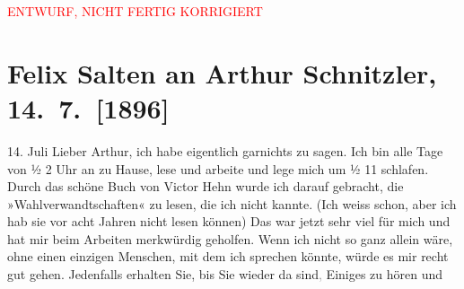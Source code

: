 
\begin{center}
            \textcolor{red}{ENTWURF, NICHT FERTIG KORRIGIERT}
                      \end{center}
            
         
         \renewcommand{\erwaehntePersonen}{Personen: Richard Beer-Hofmann, Victor Hehn, Ottilie Salten}
         \renewcommand{\erwaehnteOrte}{Orte: Kopenhagen, Trondheim, Wien}
         \renewcommand{\erwaehnteWerke}{Werke: Die Wahlverwandtschaften, Über Goethes Hermann und Dorothea}
               \section[Felix Salten an Arthur Schnitzler, 14. 7. {[}1896{]}]{ Felix Salten an Arthur Schnitzler, 14. 7. {[}1896{]}}\nopagebreak{}\rehead{ }\begin{ledgroupsized}[t]{13cm}\normalsize\beginnumbering \toendnotes[C]{\smallbreak\pagebreak[2]} 
\pstart
           \raggedleft{}{\pb}14. Juli\pend
           \pstart
           Lieber Arthur, ich habe eigentlich garnichts zu sagen. Ich bin alle
               Tage von ½ 2 Uhr an zu Hause, lese und arbeite und lege mich um ½ 11 schlafen. Durch
               das schöne Buch von Victor Hehn  wurde ich darauf gebracht, die »Wahlverwandtschaften« zu lesen, die ich nicht kannte. (Ich
               weiss schon, aber ich hab sie vor acht Jahren nicht lesen können) Das war jetzt sehr
               viel für mich und hat mir beim Arbeiten merkwürdig geholfen. Wenn ich nicht so ganz
               allein wäre, ohne einen einzigen Menschen, mit dem ich sprechen könnte, würde es mir
               recht gut gehen. Jedenfalls erhalten Sie, bis Sie wieder da sind\textcolor{gray}{,} Einiges zu hören und

\end{ledgroupsized}
